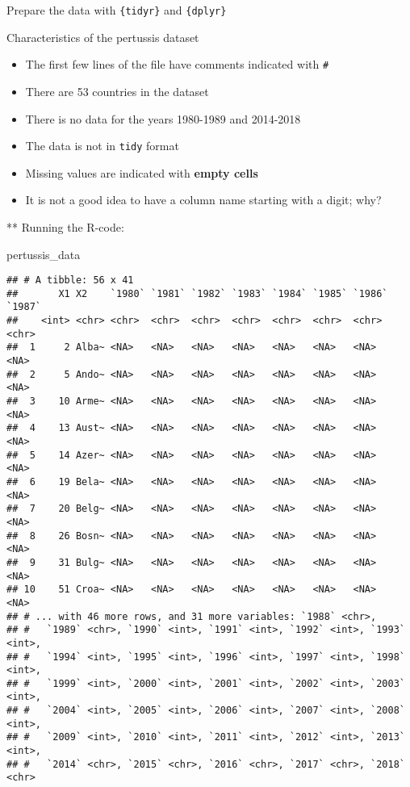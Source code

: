 \documentclass[ignorenonframetext,]{beamer}
\newenvironment{Shaded}{\begin{snugshade}}{\end{snugshade}}
\newcommand{\NormalTok}[1]{#1}
\providecommand{\tightlist}{%
  \setlength{\itemsep}{0pt}\setlength{\parskip}{0pt}}
\begin{document}
\begin{frame}[fragile]{Prepare the data with \texttt{\{tidyr\}} and
\texttt{\{dplyr\}}}
\protect\hypertarget{prepare-the-data-with-tidyr-and-dplyr}{}

\begin{block}{Characteristics of the pertussis dataset}

\begin{itemize}
\tightlist
\item
  The first few lines of the file have comments indicated with
  \texttt{\#}
\item
  There are 53 countries in the dataset
\item
  There is no data for the years 1980-1989 and 2014-2018
\item
  The data is not in \texttt{tidy} format
\item
  Missing values are indicated with \textbf{empty cells}
\item
  It is not a good idea to have a column name starting with a digit;
  why?
\end{itemize}

** Running the R-code:

\begin{Shaded}
\begin{Highlighting}[]
\NormalTok{pertussis_data}
\end{Highlighting}
\end{Shaded}

\begin{verbatim}
## # A tibble: 56 x 41
##       X1 X2    `1980` `1981` `1982` `1983` `1984` `1985` `1986` `1987`
##    <int> <chr> <chr>  <chr>  <chr>  <chr>  <chr>  <chr>  <chr>  <chr> 
##  1     2 Alba~ <NA>   <NA>   <NA>   <NA>   <NA>   <NA>   <NA>   <NA>  
##  2     5 Ando~ <NA>   <NA>   <NA>   <NA>   <NA>   <NA>   <NA>   <NA>  
##  3    10 Arme~ <NA>   <NA>   <NA>   <NA>   <NA>   <NA>   <NA>   <NA>  
##  4    13 Aust~ <NA>   <NA>   <NA>   <NA>   <NA>   <NA>   <NA>   <NA>  
##  5    14 Azer~ <NA>   <NA>   <NA>   <NA>   <NA>   <NA>   <NA>   <NA>  
##  6    19 Bela~ <NA>   <NA>   <NA>   <NA>   <NA>   <NA>   <NA>   <NA>  
##  7    20 Belg~ <NA>   <NA>   <NA>   <NA>   <NA>   <NA>   <NA>   <NA>  
##  8    26 Bosn~ <NA>   <NA>   <NA>   <NA>   <NA>   <NA>   <NA>   <NA>  
##  9    31 Bulg~ <NA>   <NA>   <NA>   <NA>   <NA>   <NA>   <NA>   <NA>  
## 10    51 Croa~ <NA>   <NA>   <NA>   <NA>   <NA>   <NA>   <NA>   <NA>  
## # ... with 46 more rows, and 31 more variables: `1988` <chr>,
## #   `1989` <chr>, `1990` <int>, `1991` <int>, `1992` <int>, `1993` <int>,
## #   `1994` <int>, `1995` <int>, `1996` <int>, `1997` <int>, `1998` <int>,
## #   `1999` <int>, `2000` <int>, `2001` <int>, `2002` <int>, `2003` <int>,
## #   `2004` <int>, `2005` <int>, `2006` <int>, `2007` <int>, `2008` <int>,
## #   `2009` <int>, `2010` <int>, `2011` <int>, `2012` <int>, `2013` <int>,
## #   `2014` <chr>, `2015` <chr>, `2016` <chr>, `2017` <chr>, `2018` <chr>
\end{verbatim}


\end{block}
\end{frame}
\end{document}
